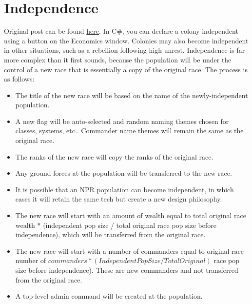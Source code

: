 \documentclass[10pt,a4paper,oneside]{article}
\begin{document}
\section{Independence}\label{6_independence}
Original post can be found
\href{http://aurora2.pentarch.org/index.php?topic=8495.msg118467#msg118467}{here}.
\newline\newline
In C\#, you can declare a colony independent using a button on the Economics window. Colonies may also become independent in other situations, such as a rebellion following high unrest. Independence is far more complex than it first sounds, because the population will be under the control of a new race that is essentially a copy of the original race. The process is as follows:
\begin{itemize}
	\item The title of the new race will be based on the name of the newly-independent population.
	\item A new flag will be auto-selected and random naming themes chosen for classes, systems, etc.. Commander name themes will remain the same as the original race.
	\item The ranks of the new race will copy the ranks of the original race.
	\item Any ground forces at the population will be transferred to the new race.
	\item It is possible that an NPR population can become independent, in which cases it will retain the same tech but create a new design philosophy.
	\item The new race will start with an amount of wealth equal to total original race wealth * (independent pop size / total original race pop size before independence), which will be transferred from the original race.
	\item The new race will start with a number of commanders equal to original race number of \( commanders * (Independent Pop Size / Total Original) \) race pop size before independence). These are new commanders and not transferred from the original race.
	\item A top-level admin command will be created at the population.
\end{itemize}
\end{document}

